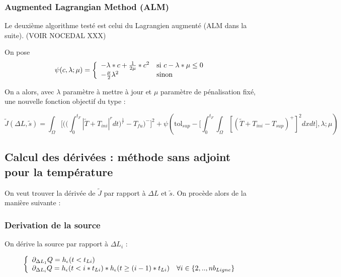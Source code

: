 \documentclass[11pt,a4paper]{article}
\begin{document}
\subsubsection*{Augmented Lagrangian Method (ALM)}

Le deuxième algorithme testé est celui du Lagrangien augmenté (ALM dans la suite). (VOIR NOCEDAL XXX)

On pose 
\begin{equation}
\psi(c,\lambda;\mu)=\left\{\begin{array}{ll}
-\lambda*c+\frac{1}{2\mu}*c^2 & \textrm{si\,\,}c-\lambda*\mu\leq 0\\
-\frac{\mu}{2}\lambda^2 & \textrm{sinon}
\end{array}\right.
\end{equation}

On a alors, avec $\lambda$ paramètre à mettre à jour et $\mu$ paramètre de pénalisation fixé, une nouvelle fonction objectif du type :

\begin{equation}
\tilde{J}(\Delta L,\tilde{s})=\int_{\Omega}\Bigg[\Bigg(\Big(\int_{0}^{t_F}|\tilde{T}+T_{ini}|^rdt\Big)^{\frac{1}{r}}-T_{fu}\Bigg)^-\Bigg]^2+\psi\left(\textrm{tol}_{sup}-\Bigg[\int_{0}^{t_F}\int_{\Omega}[(\tilde{T}+T_{ini}-T_{sup})^+]^2dxdt\Bigg],\lambda;\mu\right)
\end{equation}




\subsection*{Calcul des dérivées : méthode sans adjoint pour la température}


On veut trouver la dérivée de $\tilde{J}$ par rapport à $\Delta L$ et $\tilde{s}$. On procède alors de la manière suivante :

\subsubsection*{Derivation de la source}

On dérive la source par rapport à $\Delta L_i$ :

\begin{equation}
\left\{
\begin{array}{ll}
\partial_{\Delta L_1} Q=h_{\epsilon}(t<t_{Li}) &\,\\
\partial_{\Delta L_i} Q=h_{\epsilon}(t<i*t_{Li})*h_{\epsilon}(t\geq(i-1)*t_{Li})&\forall i\in\{2,..,nb_{Ligne}\}
\end{array}\right.
\end{equation}
\end{document}
